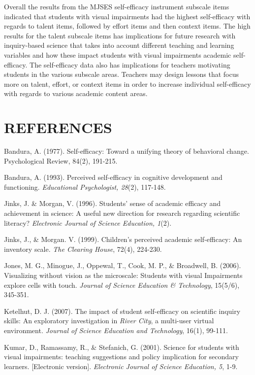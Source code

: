 \documentclass[11.5pt]{sig-alternate} %
\begin{document}
\begin{large}
Overall the results from the MJSES self-efficacy instrument subscale items indicated that students with visual impairments had the highest self-efficacy with regards to talent items, followed by effort items and then context items. The high results for the talent subscale items has implications for future research with inquiry-based science that takes into account different teaching and learning variables and how these impact students with visual impairments academic self-efficacy. The self-efficacy data also has implications for teachers motivating students in the various subscale areas. Teachers may design lessons that focus more on talent, effort, or context items in order to increase individual self-efficacy with regards to various academic content areas.
	
\end{large}
\clearpage
\section*{REFERENCES}\par 

\leftskip 0.25in
\parindent -0.25in 
Bandura, A.  (1977).  Self-efficacy: Toward a unifying theory of behavioral change. Psychological Review, 84(2), 191-215.

Bandura, A.  (1993).  Perceived self-efficacy in cognitive development and functioning. \textit{Educational Psychologist, 28}(2), 117-148.

Jinks, J. \& Morgan, V. (1996).  Students’ sense of academic efficacy and achievement in science: A useful new direction for research regarding scientific literacy?  \textit{Electronic Journal of Science Education, 1}(2).

Jinks, J., \& Morgan. V.  (1999).  Children’s perceived academic self-efficacy: An inventory scale.  \textit{The Clearing House}, 72(4), 224-230.

Jones, M. G., Minogue, J., Oppewal, T., Cook, M. P., \& Broadwell, B.  (2006). Visualizing without vision as the microscale: Students with visual Impairments explore cells with touch.  \textit{Journal of Science Education \& Technology}, 15(5/6), 345-351.

Ketelhut, D. J.  (2007).  The impact of student self-efficacy on scientific inquiry skills: An exploratory investigation in \textit{River City}, a multi-user virtual environment.  \textit{Journal of Science Education and Technology}, 16(1), 99-111.

Kumar, D., Ramassamy, R., \& Stefanich, G. (2001).  Science for students with visual impairments: teaching suggestions and policy implication for secondary learners.  [Electronic version].  \textit{Electronic Journal of Science Education, 5}, 1-9.
\end{document}
